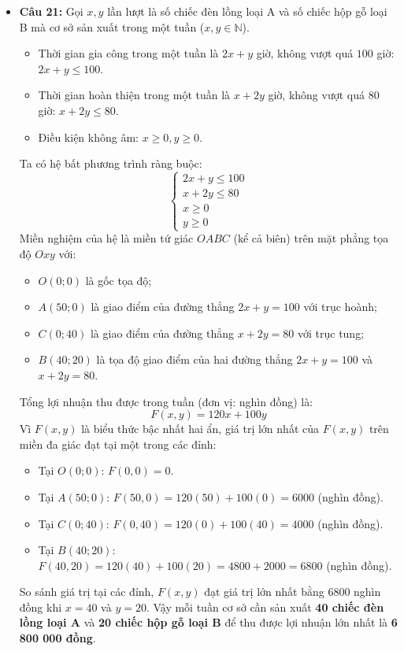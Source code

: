 \documentclass[12pt,a4paper]{article}
\begin{document}
\begin{itemize}[leftmargin=0.6cm, itemsep=6pt]
    \item \textbf{Câu 21:}
    Gọi $x, y$ lần lượt là số chiếc đèn lồng loại A và số chiếc hộp gỗ loại B mà cơ sở sản xuất trong một tuần ($x, y \in \mathbb{N}$).
    \begin{itemize}
        \item Thời gian gia công trong một tuần là $2x + y$ giờ, không vượt quá $100$ giờ: $2x + y \le 100$.
        \item Thời gian hoàn thiện trong một tuần là $x + 2y$ giờ, không vượt quá $80$ giờ: $x + 2y \le 80$.
        \item Điều kiện không âm: $x \ge 0, y \ge 0$.
    \end{itemize}
    Ta có hệ bất phương trình ràng buộc:
    \[
    \begin{cases}
    2x + y \le 100 \\
    x + 2y \le 80 \\
    x \ge 0 \\
    y \ge 0
    \end{cases}
    \]
    Miền nghiệm của hệ là miền tứ giác $OABC$ (kể cả biên) trên mặt phẳng tọa độ $Oxy$ với:
    \begin{itemize}
        \item $O(0; 0)$ là gốc tọa độ;
        \item $A(50; 0)$ là giao điểm của đường thẳng $2x + y = 100$ với trục hoành;
        \item $C(0; 40)$ là giao điểm của đường thẳng $x + 2y = 80$ với trục tung;
        \item $B(40; 20)$ là tọa độ giao điểm của hai đường thẳng $2x + y = 100$ và $x + 2y = 80$.
    \end{itemize}
    Tổng lợi nhuận thu được trong tuần (đơn vị: nghìn đồng) là:
    \[
    F(x, y) = 120x + 100y
    \]
    Vì $F(x, y)$ là biểu thức bậc nhất hai ẩn, giá trị lớn nhất của $F(x, y)$ trên miền đa giác đạt tại một trong các đỉnh:
    \begin{itemize}
        \item Tại $O(0; 0)$: $F(0, 0) = 0$.
        \item Tại $A(50; 0)$: $F(50, 0) = 120(50) + 100(0) = 6000$ (nghìn đồng).
        \item Tại $C(0; 40)$: $F(0, 40) = 120(0) + 100(40) = 4000$ (nghìn đồng).
        \item Tại $B(40; 20)$: $F(40, 20) = 120(40) + 100(20) = 4800 + 2000 = 6800$ (nghìn đồng).
    \end{itemize}
    So sánh giá trị tại các đỉnh, $F(x, y)$ đạt giá trị lớn nhất bằng $6800$ nghìn đồng khi $x = 40$ và $y = 20$.
    Vậy mỗi tuần cơ sở cần sản xuất \textbf{40 chiếc đèn lồng loại A} và \textbf{20 chiếc hộp gỗ loại B} để thu được lợi nhuận lớn nhất là \textbf{6 800 000 đồng}.


\end{itemize}
\end{document}
